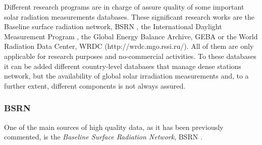 Different research programs are in charge of assure quality of some important solar radiation measurements databases. These significant research works are the Baseline surface radiation network, BSRN \cite*{Konig-Langlo2013}, the International Daylight Measurement Program \cite*{dumortier1999status}, the Global Energy Balance Archive, GEBA \cite*{Gilgen1998} or the World Radiation Data Center, WRDC (http://wrdc.mgo.rssi.ru/). All of them are only applicable for research purposes and no-commercial activities. To these databases it can be added different country-level databases that manage dense stations network, but the availability of global solar irradiation measurements and, to a further extent, different components is not always assured.


\subsubsection{BSRN}

One of the main sources of high quality data, as it has been previously commented, is the \textit{Baseline Surface Radiation Network}, BSRN \cite*{Konig-Langlo2013}. %


